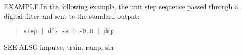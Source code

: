 \begin{options}
\end{options}

\begin{qsection}{EXAMPLE}
In the following example, the unit step sequence passed through
a digital filter and sent to the standard output:
\begin{quote}
\verb!step | dfs -a 1 -0.8 | dmp!
\end{quote}
\end{qsection}

\begin{qsection}{SEE ALSO}
  impulse, train, ramp, sin
\end{qsection}
